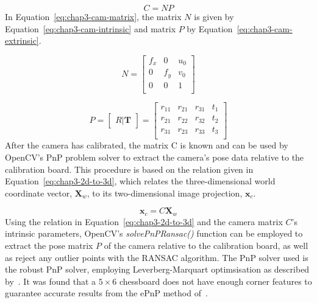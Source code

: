 \begin{equation}
  \label{eq:chap3-cam-matrix}
  C = 
  NP
\end{equation}
In Equation~\ref{eq:chap3-cam-matrix}, the matrix $N$ is given by Equation~\ref{eq:chap3-cam-intrinsic} and matrix $P$ by Equation~\ref{eq:chap3-cam-extrinsic}.

\begin{equation}
  \label{eq:chap3-cam-intrinsic}
  N = 
  \begin{bmatrix}
    f_x & 0   & u_0 \\
    0   & f_y & v_0 \\
    0   & 0   & 1   \\
  \end{bmatrix}
\end{equation}

\begin{equation}
  \label{eq:chap3-cam-extrinsic}
  P = 
  \begin{bmatrix}
    R | \bm{T}
  \end{bmatrix}
  =
  \begin{bmatrix}
    r_{11} & r_{21} & r_{31} & t_1 \\
    r_{21} & r_{22} & r_{32} & t_2 \\
    r_{31} & r_{23} & r_{33} & t_3 \\
  \end{bmatrix}
\end{equation}
After the camera has calibrated, the matrix C is known and can be used by OpenCV's PnP problem solver to extract the camera's pose data relative to the calibration board. This procedure is based on the relation given in Equation~\ref{eq:chap3-2d-to-3d}, which relates the three-dimensional world coordinate vector, $\bm{X}_w$, to its two-dimensional image projection, $\bm{x}_c$.  

\begin{equation}
   \label{eq:chap3-2d-to-3d}
   \bm{x}_c
   = C
   \bm{X}_w
\end{equation}
Using the relation in Equation~\ref{eq:chap3-2d-to-3d} and the camera matrix $C$'s intrinsic parameters, OpenCV's \emph{solvePnPRansac()} function can be employed to extract the pose matrix $P$ of the camera relative to the calibration board, as well as reject any outlier points with the RANSAC algorithm. The PnP solver used is the robust PnP solver, employing Leverberg-Marquart optimsisation as described by~\cite{schweighofer2006robust}. It was found that a $5\times6$ chessboard does not have enough corner features to guarantee accurate results from the ePnP method of~\cite{lepetit2009epnp}.

